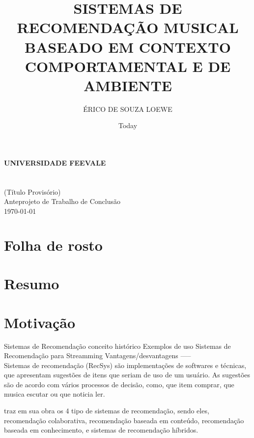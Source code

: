 \documentclass{article}
\title{SISTEMAS DE RECOMENDAÇÃO MUSICAL BASEADO EM CONTEXTO COMPORTAMENTAL E DE AMBIENTE}
\author{ÉRICO DE SOUZA LOEWE}
\date{Today}
\begin{document}
\makeatletter
\begin{titlepage}
   \begin{center}
      \large\textbf{
      UNIVERSIDADE FEEVALE\\
      \@author\\
      \@title\\
      }
      (Título Provisório)\\
      Anteprojeto de Trabalho de Conclusão\\
      \today
   \end{center}
\end{titlepage}
\makeatother

\section{Folha de rosto}
\newpage

\section{Resumo}
\newpage

\section{Motivação}

Sistemas de Recomendação
   conceito
   histórico
   Exemplos de uso
   Sistemas de Recomendação para Streamming
   Vantagens/desvantagens
----- \\


Sistemas de recomendação (RecSys) são implementações de softwares e técnicas, que apresentam sugestões de itens que seriam de uso de um usuário. As sugestões são de acordo com vários processos de decisão, como, que item comprar, que musica escutar ou que noticia ler.  \cite{ricci2011introduction}

\cite{ricci2011introduction} traz em sua obra os 4 tipo de sistemas de recomendação, sendo eles, recomendação colaborativa, recomendação baseada em conteúdo, recomendação baseada em conhecimento, e sistemas de recomendação híbridos.

\end{document}
